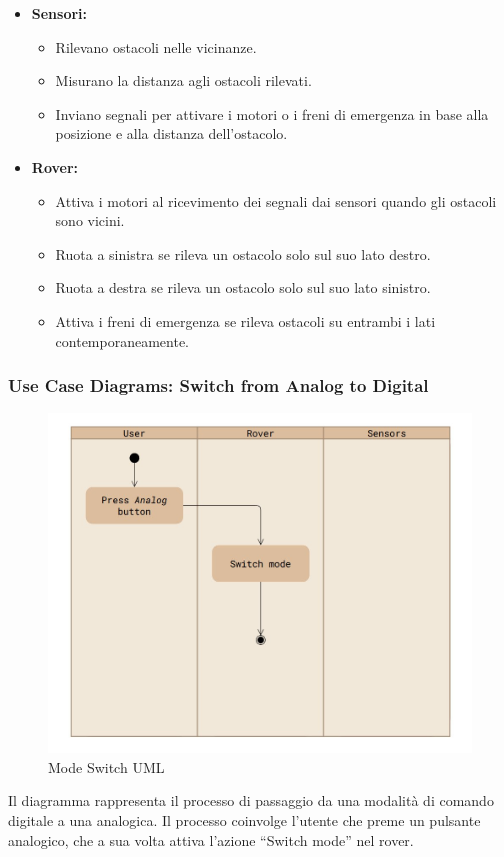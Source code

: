 \documentclass{article}
\begin{document}
        \begin{itemize}
          \item \textbf{Sensori:}
          \begin{itemize}
              \item Rilevano ostacoli nelle vicinanze.
              \item Misurano la distanza agli ostacoli rilevati.
              \item Inviano segnali per attivare i motori o i freni di emergenza in base alla posizione e alla distanza dell'ostacolo.
          \end{itemize}
      
          \item \textbf{Rover:}
          \begin{itemize}
              \item Attiva i motori al ricevimento dei segnali dai sensori quando gli ostacoli sono vicini.
              \item Ruota a sinistra se rileva un ostacolo solo sul suo lato destro.
              \item Ruota a destra se rileva un ostacolo solo sul suo lato sinistro.
              \item Attiva i freni di emergenza se rileva ostacoli su entrambi i lati contemporaneamente.
          \end{itemize}
        \end{itemize}



      \subsubsection{Use Case Diagrams: Switch from Analog to Digital}
        \begin{figure}[h]
          \includegraphics[width=0.7\linewidth]{../Use_Case_Diagram/Switch_Analog_To_Digital.jpg}
          \centering
          \caption{Mode Switch UML}       
        \end{figure}
        Il diagramma rappresenta il processo di passaggio da una modalità di comando digitale a una analogica. Il processo coinvolge l’utente che preme un pulsante analogico, che a sua volta attiva l’azione “Switch mode” nel rover.
\end{document}
